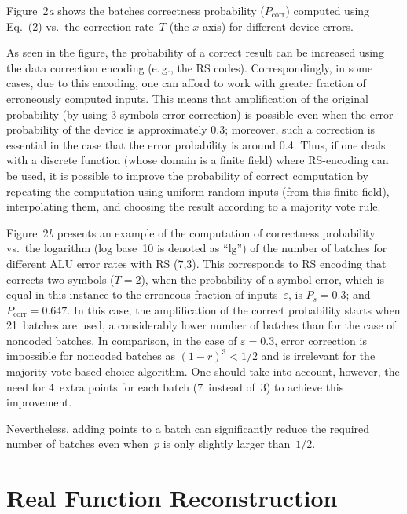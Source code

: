 \begin{multicols}{2}
   Figure~2\textit{a} shows the batches correctness probability ($P_{\mathrm{corr}}$) 
   computed using Eq.~(2) vs.\ the correction 
rate~$T$ (the $x$ axis) for different device errors. 

   As seen in the figure, the probability of a correct result can be increased using the data correction encoding (e.\,g., the 
RS codes).   Correspondingly, in some cases, 
due to this encoding, one can afford to work with greater 
fraction of erroneously computed inputs. This means that amplification of the original probability (by using 3-symbols 
error correction) is possible even when the error probability of the device is approximately 0.3; moreover, such a 
correction is essential in the case that the error probability is around 0.4. Thus, if one deals with a discrete function 
(whose domain is a finite field) where RS-encoding can be used, it is possible to improve the probability of correct 
computation by repeating the computation using uniform random inputs (from this finite field), interpolating them, and 
choosing the result according to a majority vote rule.
   
   Figure~2\textit{b} presents an example of the computation of correctness probability vs.\ the logarithm (log base~10 is denoted 
as ``lg'') of the number of batches for different ALU error rates with RS (7,3). This corresponds to RS encoding that 
corrects two symbols ($T=2$), when the probability of a symbol error, which is equal in this instance to the erroneous 
fraction of inputs~$\varepsilon$, is $P_s=0.3$; and $P_{\mathrm{corr}}=0.647$. In this case, the amplification of the correct 
probability starts when 21~batches are used, a considerably lower number of batches than for the case of noncoded batches. In 
comparison, in the case of $\varepsilon=0.3$, error correction is impossible for noncoded batches as $(1-r)^3<1/2$ and 
is irrelevant for the majority-vote-based choice algorithm. One should take into account, however, the need for 4~extra 
points for each batch (7~instead of~3) to achieve this improvement. 
{ %

}
   
   Nevertheless, adding points to a batch can significantly reduce the required number 
   of batches even when~$p$  is 
only slightly larger than~$1/2$.  
   
   
\section{Real Function Reconstruction}


\end{multicols}
